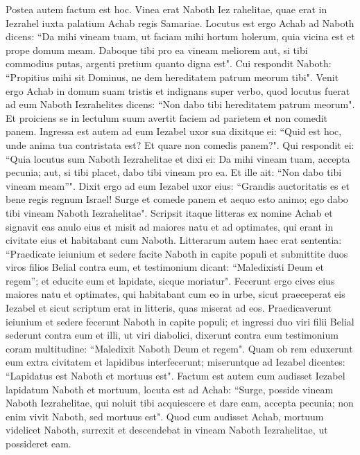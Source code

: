 \begin{biblechapter}  
\verse Postea autem factum est hoc. Vinea erat Naboth Iez rahelitae, quae erat in Iezrahel iuxta palatium Achab regis Samariae. 
\verse Locutus est ergo Achab ad Naboth dicens: “Da mihi vineam tuam, ut faciam mihi hortum holerum, quia vicina est et prope domum meam. Daboque tibi pro ea vineam meliorem aut, si tibi commodius putas, argenti pretium quanto digna est". 
\verse Cui respondit Naboth: “Propitius mihi sit Dominus, ne dem hereditatem patrum meorum tibi". 
\verse Venit ergo Achab in domum suam tristis et indignans super verbo, quod locutus fuerat ad eum Naboth Iezrahelites dicens: “Non dabo tibi hereditatem patrum meorum". Et proiciens se in lectulum suum avertit faciem ad parietem et non comedit panem. 
\verse Ingressa est autem ad eum Iezabel uxor sua dixitque ei: “Quid est hoc, unde anima tua contristata est? Et quare non comedis panem?".  
\verse Qui respondit ei: “Quia locutus sum Naboth Iezrahelitae et dixi ei: Da mihi vineam tuam, accepta pecunia; aut, si tibi placet, dabo tibi vineam pro ea. Et ille ait: “Non dabo tibi vineam meam”". 
\verse Dixit ergo ad eum Iezabel uxor eius: “Grandis auctoritatis es et bene regis regnum Israel! Surge et comede panem et aequo esto animo; ego dabo tibi vineam Naboth Iezrahelitae". 
\verse Scripsit itaque litteras ex nomine Achab et signavit eas anulo eius et misit ad maiores natu et ad optimates, qui erant in civitate eius et habitabant cum Naboth. 
\verse Litterarum autem haec erat sententia: “Praedicate ieiunium et sedere facite Naboth in capite populi 
\verse et submittite duos viros filios Belial contra eum, et testimonium dicant: “Maledixisti Deum et regem”; et educite eum et lapidate, sicque moriatur". 
\verse Fecerunt ergo cives eius maiores natu et optimates, qui habitabant cum eo in urbe, sicut praeceperat eis Iezabel et sicut scriptum erat in litteris, quas miserat ad eos. 
\verse Praedicaverunt ieiunium et sedere fecerunt Naboth in capite populi; 
\verse et ingressi duo viri filii Belial sederunt contra eum et illi, ut viri diabolici, dixerunt contra eum testimonium coram multitudine: “Maledixit Naboth Deum et regem". Quam ob rem eduxerunt eum extra civitatem et lapidibus interfecerunt;  
\verse miseruntque ad Iezabel dicentes: “Lapidatus est Naboth et mortuus est". 
\verse Factum est autem cum audisset Iezabel lapidatum Naboth et mortuum, locuta est ad Achab: “Surge, posside vineam Naboth Iezrahelitae, qui noluit tibi acquiescere et dare eam, accepta pecunia; non enim vivit Naboth, sed mortuus est". 
\verse Quod cum audisset Achab, mortuum videlicet Naboth, surrexit et descendebat in vineam Naboth Iezrahelitae, ut possideret eam. 

\end{biblechapter}
